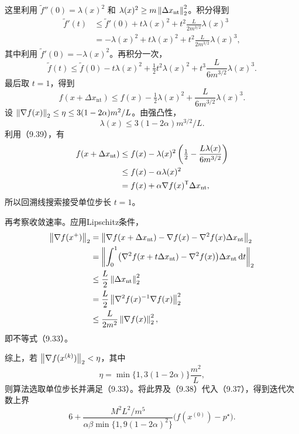 这里利用 $\widetilde f''(0)=\lambda(x)^2$ 和 $\lambda(x)^2\ge m\left\lVert \Delta x_{\mathrm{nt}}\right\rVert_2^2$。积分得到
\[
\begin{aligned}
\widetilde f'(t)&\le\widetilde f'(0)+t\lambda(x)^2
+t^2\frac L{2m^{3/2}}\lambda(x)^3\\
&=-\lambda(x)^2+t\lambda(x)^2
+t^2\frac L{2m^{3/2}}\lambda(x)^3,
\end{aligned}
\]
其中利用 $\widetilde f'(0)=-\lambda(x)^2$。再积分一次，
\[
\widetilde f(t)\le\widetilde f(0)-t\lambda(x)^2
+\tfrac12t^2\lambda(x)^2+t^3\frac L{6m^{3/2}}\lambda(x)^3.
\]
最后取 $t=1$，得到
\begin{equation}
f(x+\Delta x_{\mathrm{nt}})
\le f(x)-\tfrac12\lambda(x)^2+\frac L{6m^{3/2}}\lambda(x)^3.\tag{9.39}
\end{equation}
设 $\left\lVert \nabla f(x)\right\rVert_2\le\eta\le3(1-2\alpha)m^2/L$。由强凸性，
\[
\lambda(x)\le3(1-2\alpha)m^{3/2}/L.
\]
利用（9.39），有
\[
\begin{aligned}
f(x+\Delta x_{\mathrm{nt}})
&\le f(x)-\lambda(x)^2\left(\tfrac12-\frac{L\lambda(x)}{6m^{3/2}}\right)\\
&\le f(x)-\alpha\lambda(x)^2\\
&=f(x)+\alpha\nabla f(x)^\mathsf T\Delta x_{\mathrm{nt}},
\end{aligned}
\]
所以回溯线搜索接受单位步长 $t=1$。

再考察收敛速率。应用Lipschitz条件，
\[
\begin{aligned}
\left\lVert \nabla f(x^+)\right\rVert_2
&=\left\lVert \nabla f(x+\Delta x_{\mathrm{nt}})-\nabla f(x)
-\nabla^2f(x)\Delta x_{\mathrm{nt}}\right\rVert_2\\
&=\left\|\int_0^1
\bigl(\nabla^2f(x+t\Delta x_{\mathrm{nt}})-\nabla^2f(x)\bigr)
\Delta x_{\mathrm{nt}}\,\mathrm dt\right\|_2\\
&\le\frac L2\left\lVert \Delta x_{\mathrm{nt}}\right\rVert_2^2\\
&=\frac L2\left\lVert \nabla^2f(x)^{-1}\nabla f(x)\right\rVert_2^2\\
&\le\frac L{2m^2}\left\lVert \nabla f(x)\right\rVert_2^2,
\end{aligned}
\]
即不等式（9.33）。

综上，若 $\left\lVert \nabla f(x^{(k)})\right\rVert_2<\eta$，其中
\[
\eta=\min\{1,3(1-2\alpha)\}\frac{m^2}{L},
\]
则算法选取单位步长并满足（9.33）。将此界及（9.38）代入（9.37），得到迭代次数上界
\begin{equation}
6+\frac{M^2L^2/m^5}{\alpha\beta\min\{1,9(1-2\alpha)^2\}}
\bigl(f(x^{(0)})-p^\star\bigr).\tag{9.40}
\end{equation}

